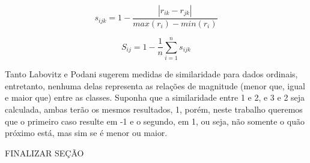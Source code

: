 \documentclass[preprint,12pt]{elsarticle}
\begin{document}
\begin{equation}
\label{eqn:gower-s}
    s_{ijk} =  1 - \frac{|r_{ik} - r_{jk}|}{max(r_i) - min(r_i)}
\end{equation}

\begin{equation}
\label{eqn:gower-S}
    S_{ij} =  1 - \frac{1}{n}\sum^n_{i=1}s_{ijk}
\end{equation}

Tanto Labovitz e Podani sugerem medidas de similaridade para dados ordinais, entretanto, nenhuma delas representa as relações de magnitude (menor que, igual e maior que) entre as classes. Suponha que a similaridade entre 1 e 2, e 3 e 2 seja calculada, ambas terão os mesmos resultados, 1, porém, neste trabalho queremos que o primeiro caso resulte em -1 e o segundo, em 1, ou seja, não somente o quão próximo está, mas sim se é menor ou maior.

FINALIZAR SEÇÃO




\end{document}
